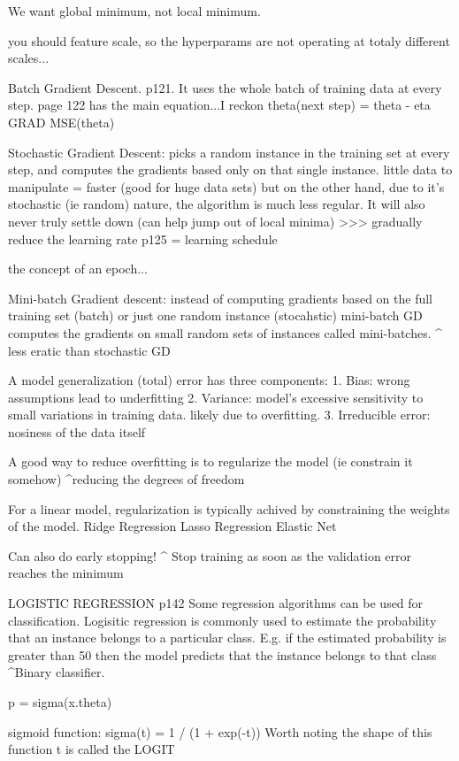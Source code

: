 We want global minimum, not local minimum.

you should feature scale, so the hyperparams are not operating at totaly different scales...

Batch Gradient Descent. p121.
It uses the whole batch of training data at every step.
page 122 has the main equation...I reckon
theta(next step) = theta - eta GRAD MSE(theta)

Stochastic Gradient Descent:
picks a random instance in the training set at every step,
and computes the gradients based only on that single instance.
little data to manipulate = faster (good for huge data sets)
but on the other hand,
due to it's stochastic (ie random) nature,
the algorithm is much less regular.
It will also never truly settle down (can help jump out of local minima)
>>> gradually reduce the learning rate p125 = learning schedule

the concept of an epoch...

Mini-batch Gradient descent:
instead of computing gradients based on the full training set (batch)
or just one random instance (stocahstic)
mini-batch GD computes the gradients on small random sets of instances called mini-batches.
^ less eratic than stochastic GD

A model generalization (total) error has three components:
1. Bias: wrong assumptions lead to underfitting
2. Variance: model's excessive sensitivity to small variations in training data. likely due to overfitting.
3. Irreducible error: nosiness of the data itself


A good way to reduce overfitting is to regularize the model (ie constrain it somehow)
^reducing the degrees of freedom

For a linear model, regularization is typically achived by constraining the weights of the model.
Ridge Regression
Lasso Regression
Elastic Net

Can also do early stopping!
^ Stop training as soon as the validation error reaches the minimum

LOGISTIC REGRESSION p142
Some regression algorithms can be used for classification.
Logisitic regression is commonly used to estimate the probability that
an instance belongs to a particular class.
E.g. if the estimated probability is greater than 50%
then the model predicts that the instance belongs to that class
^Binary classifier.

p = sigma(x.theta)

sigmoid function:
sigma(t) = 1 / (1 + exp(-t))
Worth noting the shape of this function
t is called the LOGIT

